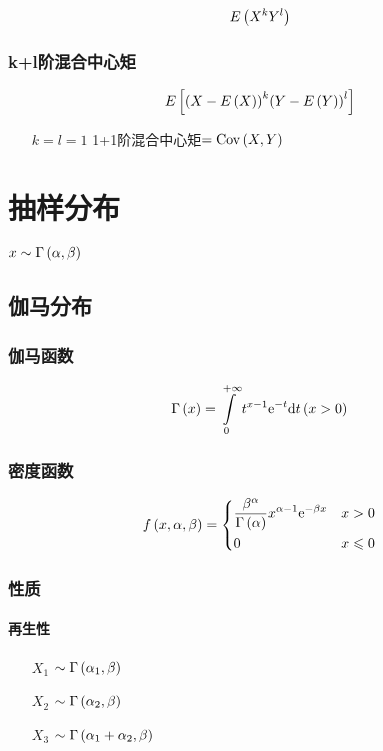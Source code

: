 \documentclass{article}
\begin{document}
\[E\left(X^kY^l\right)\]

\subsubsection{k+l阶混合中心矩}

\[E\left[{\left(X-E\left(X\right)\right)}^k{\left(Y-E\left(Y\right)\right)}^l\right]\]

\begin{enumerate}
    \item [$k=l=1$] 1+1阶混合中心矩$=\mathrm{Cov}\left(X,Y\right)$
\end{enumerate}

\section{抽样分布}

$x\sim\Gamma\left(\alpha,\beta\right)$

\subsection{伽马分布}

\subsubsection{伽马函数}

\[\Gamma\left(x\right)=\int\limits_0^{+\infty}t^{x-1}\mathrm e^{-t}\mathrm d t\left(x>0\right)\]

\subsubsection{密度函数}

\[f\left(x,\alpha,\beta\right)=
    \left\{\begin{aligned}
         & \frac{\beta^\alpha}{\Gamma\left(\alpha\right)}x^{\alpha-1}\mathrm e^{-\beta x} &  & x>0         \\
         & 0                                                              &  & x\leqslant0
    \end{aligned}\right.\]

\subsubsection{性质}

\paragraph{再生性}

\begin{enumerate}
    \item [$X_1$] $\sim\Gamma\left(\alpha_1,\beta\right)$
    \item [$X_2$] $\sim\Gamma\left(\alpha_2,\beta\right)$
    \item [$X_3$] $\sim\Gamma\left(\alpha_1+\alpha_2,\beta\right)$
\end{enumerate}
\end{document}
